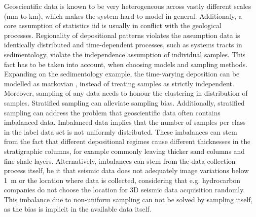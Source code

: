 
Geoscientific data is known to be very heterogeneous across vastly different scales (mm to km), which makes the system hard to model in general. Additionaly, a core assumption of statistics \ac{iid} is usually in conflict with the geological processes. Regionality of depositional patterns violates the assumption data is identically distributed and time-dependent processes, such as systems tracts in sedimentology, violate the independence assumption of individual samples. This fact has to be taken into account, when choosing models and sampling methods. Expanding on the sedimentology example, the time-varying deposition can be modelled as markovian \citep{schwarzacher1972semi}, instead of treating samples as strictly independent. Moreover, sampling of any data needs to honour the clustering in distribution of samples. Stratified sampling \citep{kish1965survey} can alleviate sampling bias. Additionally, stratified sampling can address the problem that geoscientific data often contains imbalanced data. Imbalanced data implies that the number of samples per class in the label data set is not uniformly distributed. These imbalances can stem from the fact that different depositional regimes cause different thicknesses in the stratigraphic columns, for example commonly leaving thicker sand columns and fine shale layers. Alternatively, imbalances can stem from the data collection process itself, be it that seismic data does not adequately image variations below 1~m or the location where data is collected, considering that e.g. hydrocarbon companies do not choose the location for 3D seismic data acquisition randomly. This imbalance due to non-uniform sampling can not be solved by sampling itself, as the bias is implicit in the available data itself. 




